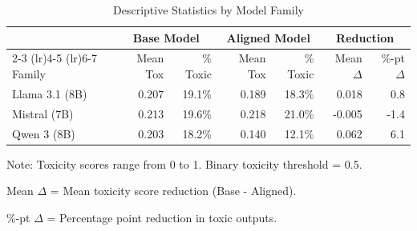 \begin{table}[htbp]
\centering
\caption{Descriptive Statistics by Model Family}
\label{tab:descriptive}
\begin{tabular}{lrrrrrr}
\toprule
& \multicolumn{2}{c}{Base Model} & \multicolumn{2}{c}{Aligned Model} & \multicolumn{2}{c}{Reduction} \\
\cmidrule(lr){2-3} \cmidrule(lr){4-5} \cmidrule(lr){6-7}
Family & Mean Tox & \% Toxic & Mean Tox & \% Toxic & Mean $\Delta$ & \%-pt $\Delta$ \\
\midrule
Llama 3.1 (8B) & 0.207 & 19.1\% & 0.189 & 18.3\% & 0.018 & 0.8 \\
Mistral (7B) & 0.213 & 19.6\% & 0.218 & 21.0\% & -0.005 & -1.4 \\
Qwen 3 (8B) & 0.203 & 18.2\% & 0.140 & 12.1\% & 0.062 & 6.1 \\
\bottomrule
\end{tabular}
\begin{tablenotes}
\small
\item Note: Toxicity scores range from 0 to 1. Binary toxicity threshold = 0.5.
\item Mean $\Delta$ = Mean toxicity score reduction (Base - Aligned).
\item \%-pt $\Delta$ = Percentage point reduction in toxic outputs.
\end{tablenotes}
\end{table}
